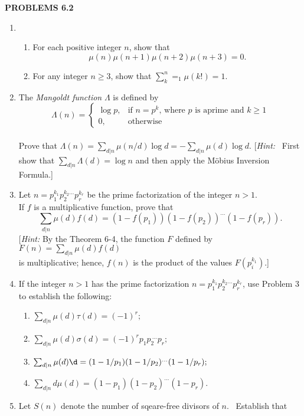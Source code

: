 \documentclass[11pt]{article}
\begin{document}
	\begin{center}
	\LARGE {\textsf {\textbf {PROBLEMS 6.2}}}\\[5mm]
\end{center}
\begin{enumerate}
\item 	\begin{enumerate}
\item For each positive integer $n$, show that\\
$$\mu(n)\mu(n+1)\mu(n+2)\mu(n+3)=0.$$
\item For any integer $n\ge3$, show that
$\sum_k^n=_1\mu(k!)=1.$
\end{enumerate}
\item The {\it Mangoldt function} $\Lambda$ is defined by\\
$$\Lambda(n)=\begin{cases}
\log{p},&\text{if $n=p^k$, where $p$ is aprime and $k\ge1$} \\
0,&\text{otherwise}
\end{cases}$$\\
Prove that $\Lambda(n)=\sum_{d|n}\mu(n/d)\log{d}=-\sum_{d|n}\mu(d)\log{d}.$ [{\it Hint:} ~First show that $\sum_{d|n}\Lambda(d)=\log{n}$ and then apply the M\"obius Inversion Formula.]
\item Let $n=p_1^{k_1}p_2^{k_2\dots}p_r^{k_r}$ be the prime factorization of the integer $n>1$.\\
 If $f$ is a multiplicative function, prove that\\
$$\sum_{d|n}\mu(d)f(d)=(1-f(p_1))(1-f(p_2))^{\dots} (1-f(p_r)).$$
[{\itshape Hint:}\: By the Theorem 6-4, the function $F$ defined by $F(n)=\sum_{d|n}\mu(d)f(d)$\\
 is multiplicative; hence, $f(n)$ is the product of the values $F(p_i^{k_1})$.]
\item If the integer $n>1$ has the prime factorization $n=p_1^{k_1}p_2^{k_2\dots}p_r^{k_r}$, use Problem 3 to establish the following:
\begin{enumerate}
	\item $\sum_{d|n}\mu(d)\tau(d)=(-1)^r;$
	\setlength{\parskip}{3mm}
	\item $\sum_{d|n}\mu(d)\sigma(d)=(-1)^rp_1p_{2~} ^{~\dots}p_r;$
	\item $\sum_{d|n}\mu(d)\d=(1-1/p_1)(1-1/p_2)^{\dots}(1-1/p_r);$
	\item $\sum_{d|n}d\mu(d)=(1-p_1)(1-p_2)^{\dots}(1-p_r).$
\end{enumerate}
\item Let $S(n)$ denote the number of sqeare-free divisors of $n$.~ Establish that\\

\end{enumerate}
\end{document}
